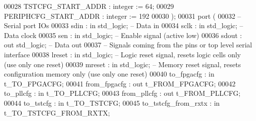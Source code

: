 \begin{DoxyCode}
00028       \textcolor{vhdlchar}{TSTCFG_START_ADDR}    \textcolor{vhdlchar}{:} \textcolor{comment}{integer} \textcolor{vhdlchar}{:=} \textcolor{vhdllogic}{}\textcolor{vhdllogic}{64};
00029       \textcolor{vhdlchar}{PERIPHCFG_START_ADDR} \textcolor{vhdlchar}{:} \textcolor{comment}{integer} \textcolor{vhdlchar}{:=} \textcolor{vhdllogic}{}\textcolor{vhdllogic}{192}
00030       \textcolor{vhdlchar}{)};
00031    \textcolor{keywordflow}{port} \textcolor{vhdlchar}{(}
00032 \textcolor{keyword}{      -- Serial port IOs}
00033       \textcolor{vhdlchar}{sdin}                 \textcolor{vhdlchar}{:} \textcolor{keywordflow}{in}  \textcolor{comment}{std\_logic};\textcolor{keyword}{   -- Data in}
00034       \textcolor{vhdlchar}{sclk}                 \textcolor{vhdlchar}{:} \textcolor{keywordflow}{in}  \textcolor{comment}{std\_logic};\textcolor{keyword}{   -- Data clock}
00035       \textcolor{vhdlchar}{sen}                  \textcolor{vhdlchar}{:} \textcolor{keywordflow}{in}  \textcolor{comment}{std\_logic};\textcolor{keyword}{   -- Enable signal (active low)}
00036       \textcolor{vhdlchar}{sdout}                \textcolor{vhdlchar}{:} \textcolor{keywordflow}{out} \textcolor{comment}{std\_logic};\textcolor{keyword}{  -- Data out      }
00037 \textcolor{keyword}{      -- Signals coming from the pins or top level serial interface}
00038       \textcolor{vhdlchar}{lreset}               \textcolor{vhdlchar}{:} \textcolor{keywordflow}{in}  \textcolor{comment}{std\_logic};\textcolor{keyword}{   -- Logic reset signal, resets logic cells only  (use only one
       reset)}
00039       \textcolor{vhdlchar}{mreset}               \textcolor{vhdlchar}{:} \textcolor{keywordflow}{in}  \textcolor{comment}{std\_logic};\textcolor{keyword}{   -- Memory reset signal, resets configuration memory only (use
       only one reset)}
00040       \textcolor{vhdlchar}{to_fpgacfg}           \textcolor{vhdlchar}{:} \textcolor{keywordflow}{in}  \textcolor{vhdlchar}{t_TO_FPGACFG};
00041       \textcolor{vhdlchar}{from_fpgacfg}         \textcolor{vhdlchar}{:} \textcolor{keywordflow}{out} \textcolor{vhdlchar}{t_FROM_FPGACFG};
00042       \textcolor{vhdlchar}{to_pllcfg}            \textcolor{vhdlchar}{:} \textcolor{keywordflow}{in}  \textcolor{vhdlchar}{t_TO_PLLCFG};
00043       \textcolor{vhdlchar}{from_pllcfg}          \textcolor{vhdlchar}{:} \textcolor{keywordflow}{out} \textcolor{vhdlchar}{t_FROM_PLLCFG};
00044       \textcolor{vhdlchar}{to_tstcfg}            \textcolor{vhdlchar}{:} \textcolor{keywordflow}{in}  \textcolor{vhdlchar}{t_TO_TSTCFG};
00045       \textcolor{vhdlchar}{to_tstcfg_from_rxtx}  \textcolor{vhdlchar}{:} \textcolor{keywordflow}{in}  \textcolor{vhdlchar}{t_TO_TSTCFG_FROM_RXTX};

\end{DoxyCode}
